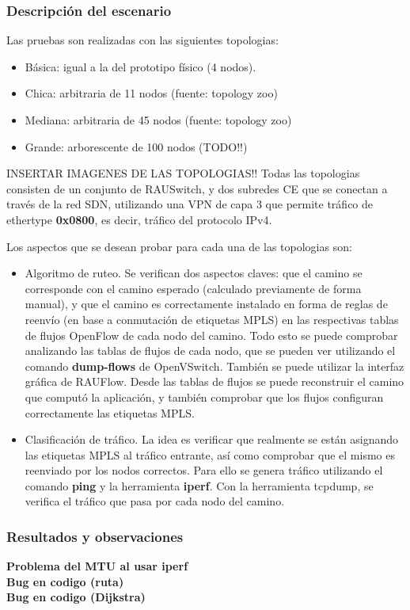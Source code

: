 \documentclass[a4paper,12pt]{report}
\begin{document}
\subsubsection{Descripción del escenario}
Las pruebas son realizadas con las siguientes topologias:
\begin{itemize}
	\item Básica: igual a la del prototipo físico (4 nodos).
	\item Chica: arbitraria de 11 nodos (fuente: topology zoo)
	\item Mediana: arbitraria de 45 nodos (fuente: topology zoo)
	\item Grande: arborescente de 100 nodos (TODO!!)
\end{itemize}
INSERTAR IMAGENES DE LAS TOPOLOGIAS!!
Todas las topologias consisten de un conjunto de RAUSwitch, y dos subredes CE que se conectan a través de la red SDN, utilizando una VPN de capa 3 que permite tráfico de ethertype \textbf{0x0800}, es decir, tráfico del protocolo IPv4.

Los aspectos que se desean probar para cada una de las topologias son:
\begin{itemize}
	\item Algoritmo de ruteo. Se verifican dos aspectos claves: que el camino se corresponde con el camino esperado (calculado previamente de forma manual), y que el camino es correctamente instalado en forma de reglas de reenvío (en base a conmutación de etiquetas MPLS) en las respectivas tablas de flujos OpenFlow de cada nodo del camino. Todo esto se puede comprobar analizando las tablas de flujos de cada nodo, que se pueden ver utilizando el comando \textbf{dump-flows} de OpenVSwitch. También se puede utilizar la interfaz gráfica de RAUFlow. Desde las tablas de flujos se puede reconstruir el camino que computó la aplicación, y también comprobar que los flujos configuran correctamente las etiquetas MPLS.
	
	\item Clasificación de tráfico. La idea es verificar que realmente se están asignando las etiquetas MPLS al tráfico entrante, así como comprobar que el mismo es reenviado por los nodos correctos. Para ello se genera tráfico utilizando el comando \textbf{ping} y la herramienta \textbf{iperf}. Con la herramienta tcpdump, se verifica el tráfico que pasa por cada nodo del camino.
\end{itemize}

\subsubsection{Resultados y observaciones}
\textbf{Problema del MTU al usar iperf} \\
\textbf{Bug en codigo (ruta)} \\
\textbf{Bug en codigo (Dijkstra)} \\
\end{document}
